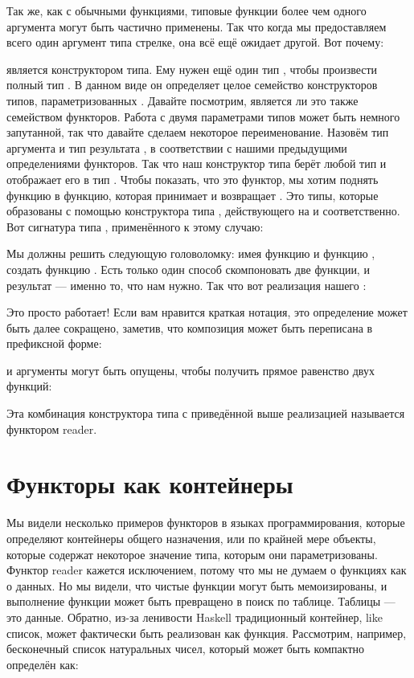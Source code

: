 Так же, как с обычными функциями, типовые функции более чем одного аргумента могут быть частично применены. Так что когда мы предоставляем всего один аргумент типа стрелке, она всё ещё ожидает другой. Вот почему:

является конструктором типа. Ему нужен ещё один тип , чтобы произвести полный тип . В данном виде он определяет целое семейство конструкторов типов, параметризованных . Давайте посмотрим, является ли это также семейством функторов. Работа с двумя параметрами типов может быть немного запутанной, так что давайте сделаем некоторое переименование. Назовём тип аргумента  и тип результата , в соответствии с нашими предыдущими определениями функторов. Так что наш конструктор типа берёт любой тип  и отображает его в тип . Чтобы показать, что это функтор, мы хотим поднять функцию  в функцию, которая принимает  и возвращает . Это типы, которые образованы с помощью конструктора типа , действующего на  и  соответственно. Вот сигнатура типа , применённого к этому случаю:

Мы должны решить следующую головоломку: имея функцию  и функцию , создать функцию . Есть только один способ скомпоновать две функции, и результат — именно то, что нам нужно. Так что вот реализация нашего :

Это просто работает! Если вам нравится краткая нотация, это определение может быть далее сокращено, заметив, что композиция может быть переписана в префиксной форме:

и аргументы могут быть опущены, чтобы получить прямое равенство двух функций:

Эта комбинация конструктора типа  с приведённой выше реализацией  называется функтором reader.

\section{Функторы как контейнеры}

Мы видели несколько примеров функторов в языках программирования, которые определяют контейнеры общего назначения, или по крайней мере объекты, которые содержат некоторое значение типа, которым они параметризованы. Функтор reader кажется исключением, потому что мы не думаем о функциях как о данных. Но мы видели, что чистые функции могут быть мемоизированы, и выполнение функции может быть превращено в поиск по таблице. Таблицы — это данные. Обратно, из-за ленивости Haskell традиционный контейнер, like список, может фактически быть реализован как функция. Рассмотрим, например, бесконечный список натуральных чисел, который может быть компактно определён как:

